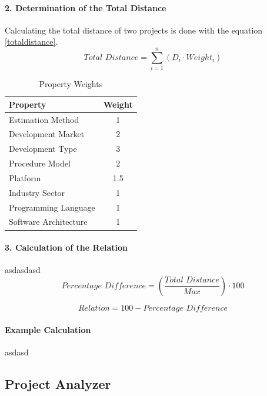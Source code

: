 \paragraph*{\textbf{2. Determination of the Total Distance}}
Calculating the total distance of two projects is done with the equation \ref{totaldistance}. 
\begin{equation}
\textit{Total Distance} = \sum \limits_{i=1}^n ( D_i \cdot Weight_i )\label{totaldistance}
\end{equation}

\begin{table}[h]
	\centering 
	\setlength{\tabcolsep}{4pt}
	\begin{tabular}{|l|c|}\hline
		Property	& Weight 	\\ \hline
		Estimation Method   	& 1      	\\ \hline
		Development Market   	& 2      	\\ \hline
		Development Type   		& 3      	\\ \hline
		Procedure Model   		& 2      	\\ \hline
		Platform   				& 1.5      	\\ \hline
		Industry Sector   		& 1      	\\ \hline
		Programming Language   	& 1      	\\ \hline
		Software Architecture   & 1      	\\ \hline
	\end{tabular} 
	\caption{Property Weights} 
	\label{propertyweights} 
\end{table}
\paragraph*{\textbf{3. Calculation of the Relation}}
asdasdasd\\
\begin{equation}
\textit{Percentage Difference} =  (\frac{\textit{Total Distance}}{\textit{Max}})\cdot 100\label{difference}
\end{equation}

\begin{equation}
\textit{Relation} =  100 - \textit{Percentage Difference} \label{relation}
\end{equation}
\paragraph*{\textbf{Example Calculation}}
asdasd

\subsection{Project Analyzer}

